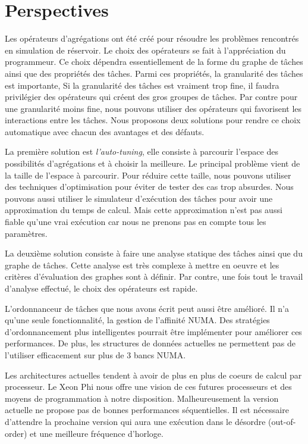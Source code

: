 \section{Perspectives}
Les opérateurs d'agrégations ont été créé pour résoudre les problèmes rencontrés en simulation de réservoir.
%
Le choix des opérateurs se fait à l'appréciation du programmeur.
%
Ce choix dépendra essentiellement de la forme du graphe de tâches ainsi que des propriétés des tâches.
%
Parmi ces propriétés, la granularité des tâches est importante,
%
Si la granularité des tâches est vraiment trop fine, il faudra privilégier des opérateurs qui créent des gros groupes de tâches.
%
Par contre pour une granularité moins fine, nous pouvons utiliser des opérateurs qui favorisent les interactions entre les tâches.
%
Nous proposons deux solutions pour rendre ce choix automatique avec chacun des avantages et des défauts.


La première solution est {\em l'auto-tuning}, elle consiste à parcourir l'espace des possibilités d'agrégations et à choisir la meilleure.
%
Le principal problème vient de la taille de l'espace à parcourir.
%
Pour réduire cette taille, nous pouvons utiliser des techniques d'optimisation pour éviter de tester des cas trop absurdes.
%
Nous pouvons aussi utiliser le simulateur d'exécution des tâches pour avoir une approximation du temps de calcul.
%
Mais cette approximation n'est pas aussi fiable qu'une vrai exécution car nous ne prenons pas en compte tous les paramètres.


La deuxième solution consiste à faire une analyse statique des tâches ainsi que du graphe de tâches.
%
Cette analyse est très complexe à mettre en oeuvre et les critères d'évaluation des graphes sont à définir.
%
Par contre, une fois tout le travail d'analyse effectué, le choix des opérateurs est rapide.


L'ordonnanceur de tâches que nous avons écrit peut aussi être amélioré.
%
Il n'a qu'une seule fonctionnalité, la gestion de l'affinité NUMA.
%
Des stratégies d'ordonnancement plus intelligentes pourrait être implémenter pour améliorer ces performances.
%
De plus, les structures de données actuelles ne permettent pas de l'utiliser efficacement sur plus de 3 bancs NUMA.



Les architectures actuelles tendent à avoir de plus en plus de coeurs de calcul par processeur.
%
Le Xeon Phi nous offre une vision de ces futures processeurs et des moyens de programmation à notre disposition.
%
Malheureusement la version actuelle ne propose pas de bonnes performances séquentielles.
%
Il est nécessaire d'attendre la prochaine version qui aura une exécution dans le désordre (out-of-order) et une meilleure fréquence d'horloge.

